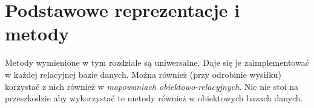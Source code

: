 \chapter{Podstawowe reprezentacje i metody}

Metody wymienione w tym rozdziale są uniwersalne. Daje się je zaimplementować w każdej relacyjnej bazie danych. 
Można również (przy odrobinie wysiłku) korzystać z nich również w \emph{mapowaniach obiektowo-relacyjnych}.
Nic nie stoi na przeszkodzie aby wykorzystać te metody również w obiektowych bazach danych.

